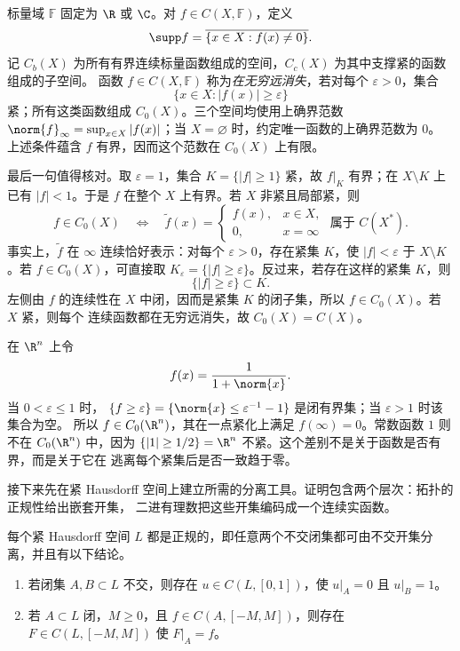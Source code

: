 \begin{definition}[支撑与三类连续函数]\label{def:1-3-1-3}
标量域 $\mathbb F$ 固定为 $\R$ 或 $\C$。对 $f\in C(X,\mathbb F)$，定义
\[
  \supp f=\overline{\{x\in X:f(x)\ne0\}}.
\]
记 $C_b(X)$ 为所有有界连续标量函数组成的空间，$C_c(X)$ 为其中支撑紧的函数组成的子空间。
函数 $f\in C(X,\mathbb F)$ 称为\emph{在无穷远消失}，若对每个 $\varepsilon>0$，集合
\[
  \{x\in X:|f(x)|\geq\varepsilon\}
\]
紧；所有这类函数组成 $C_0(X)$。三个空间均使用上确界范数
$\norm{f}_\infty=\sup_{x\in X}|f(x)|$；当 $X=\varnothing$ 时，约定唯一函数的上确界范数为 $0$。
上述条件蕴含 $f$ 有界，因而这个范数在 $C_0(X)$ 上有限。
\end{definition}

最后一句值得核对。取 $\varepsilon=1$，集合 $K=\{|f|\ge1\}$ 紧，故 $f|_K$ 有界；在 $X\setminus K$
上已有 $|f|<1$。于是 $f$ 在整个 $X$ 上有界。若 $X$ 非紧且局部紧，则
\[
 f\in C_0(X)
 \quad\Longleftrightarrow\quad
 \widetilde f(x)=
 \begin{cases}
   f(x),&x\in X,\\
   0,&x=\infty
 \end{cases}
 \text{ 属于 }C(X^*).
\]
事实上，$\widetilde f$ 在 $\infty$ 连续恰好表示：对每个 $\varepsilon>0$，存在紧集 $K$，使
$|f|<\varepsilon$ 于 $X\setminus K$。若 $f\in C_0(X)$，可直接取
$K_\varepsilon=\{|f|\ge\varepsilon\}$。反过来，若存在这样的紧集 $K$，则
\[
  \{|f|\ge\varepsilon\}\subset K.
\]
左侧由 $f$ 的连续性在 $X$ 中闭，因而是紧集 $K$ 的闭子集，所以 $f\in C_0(X)$。若 $X$ 紧，则每个
连续函数都在无穷远消失，故
$C_0(X)=C(X)$。

\begin{example}[无穷远处的连续性]\label{ex:1-3-1-2}
在 $\R^n$ 上令
\[
  f(x)=\frac{1}{1+\norm{x}}.
\]
当 $0<\varepsilon\le1$ 时，
$\{f\ge\varepsilon\}=\{\norm{x}\le\varepsilon^{-1}-1\}$ 是闭有界集；当 $\varepsilon>1$ 时该集合为空。
所以 $f\in C_0(\R^n)$，其在一点紧化上满足 $f(\infty)=0$。常数函数 $1$ 则不在
$C_0(\R^n)$ 中，因为 $\{|1|\ge1/2\}=\R^n$ 不紧。这个差别不是关于函数是否有界，而是关于它在
逃离每个紧集后是否一致趋于零。
\end{example}

接下来先在紧 Hausdorff 空间上建立所需的分离工具。证明包含两个层次：拓扑的正规性给出嵌套开集，
二进有理数把这些开集编码成一个连续实函数。

\begin{theorem}\label{theorem:1-3-1-compact-separation}
每个紧 Hausdorff 空间 $L$ 都是正规的，即任意两个不交闭集都可由不交开集分离，并且有以下结论。
\begin{enumerate}
  \item 若闭集 $A,B\subset L$ 不交，则存在 $u\in C(L,[0,1])$，使
        $u|_A=0$ 且 $u|_B=1$。
  \item 若 $A\subset L$ 闭，$M\ge0$，且 $f\in C(A,[-M,M])$，则存在
        $F\in C(L,[-M,M])$ 使 $F|_A=f$。
\end{enumerate}
\end{theorem}

